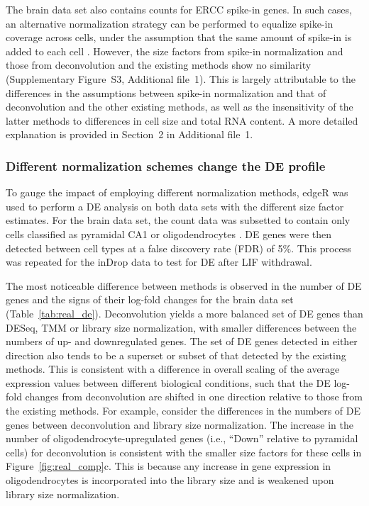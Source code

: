 \documentclass{bmcart}
\newcommand{\suppspikesec}{2}
\newcommand{\suppspikefig}{S3}
\begin{document}
The brain data set also contains counts for ERCC spike-in genes.
In such cases, an alternative normalization strategy can be performed to equalize spike-in coverage across cells, 
    under the assumption that the same amount of spike-in is added to each cell \cite{stegle2015computational}.
However, the size factors from spike-in normalization and those from deconvolution and the existing methods show no similarity (Supplementary Figure~\suppspikefig{}, Additional file~1).
This is largely attributable to the differences in the assumptions between spike-in normalization and that of deconvolution and the other existing methods,
    as well as the insensitivity of the latter methods to differences in cell size and total RNA content.
A more detailed explanation is provided in Section~\suppspikesec{} in Additional file~1.

\subsubsection*{Different normalization schemes change the DE profile}
To gauge the impact of employing different normalization methods, edgeR was used to perform a DE analysis on both data sets with the different size factor estimates. 
For the brain data set, the count data was subsetted to contain only cells classified as pyramidal CA1 or oligodendrocytes \cite{zeisel2015brain}.
DE genes were then detected between cell types at a false discovery rate (FDR) of 5\%.
This process was repeated for the inDrop data to test for DE after LIF withdrawal.

The most noticeable difference between methods is observed in the number of DE genes and the signs of their log-fold changes for the brain data set (Table~\ref{tab:real_de}).
Deconvolution yields a more balanced set of DE genes than DESeq, TMM or library size normalization, with smaller differences between the numbers of up- and downregulated genes.
The set of DE genes detected in either direction also tends to be a superset or subset of that detected by the existing methods.
This is consistent with a difference in overall scaling of the average expression values between different biological conditions, 
    such that the DE log-fold changes from deconvolution are shifted in one direction relative to those from the existing methods.
For example, consider the differences in the numbers of DE genes between deconvolution and library size normalization.
The increase in the number of oligodendrocyte-upregulated genes (i.e., ``Down'' relative to pyramidal cells) for deconvolution is consistent with the smaller size factors for these cells in Figure~\ref{fig:real_comp}c.
This is because any increase in gene expression in oligodendrocytes is incorporated into the library size and is weakened upon library size normalization.
\end{document}
